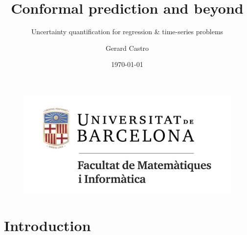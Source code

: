 \documentclass{beamer}
\title{Conformal prediction and beyond}
\subtitle{Uncertainty quantification for regression \& time-series problems}
\institute{%
Universitat de Barcelona}
\author{Gerard Castro}
\date{\today}
\begin{document}

\begin{frame}
    \titlepage
    \begin{figure}[htpb]
        \begin{center}
           \includegraphics[width=0.4\linewidth]{Figures/fmiub.png}
        \end{center}
    \end{figure}
\end{frame}




\section{Introduction}

\end{document}
